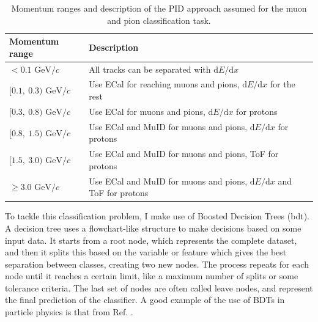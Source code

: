 \begin{table}[t]
	\caption{Momentum ranges and description of the PID approach assumed for the muon and pion classification task.}
	\begin{center}
		\begin{small}
			\begin{tabular}{p{2.7cm}|l}
				Momentum range                                    & Description                                                                          \\[1mm] \hline \rule{0pt}{1.1\normalbaselineskip}
				$< 0.1$ \hfill $\mathrm{GeV}/c$      & All tracks can be separated with $\mathrm{d}E/\mathrm{d}x$                           \\[2mm]
				$[0.1,~0.3)$ \hfill $\mathrm{GeV}/c$ & Use ECal for reaching muons and pions, $\mathrm{d}E/\mathrm{d}x$ for the rest        \\[2mm]
				$[0.3,~0.8)$ \hfill $\mathrm{GeV}/c$ & Use ECal for muons and pions, $\mathrm{d}E/\mathrm{d}x$ for protons                  \\[2mm]
				$[0.8,~1.5)$ \hfill $\mathrm{GeV}/c$ & Use ECal and MuID for muons and pions,  $\mathrm{d}E/\mathrm{d}x$ for protons        \\[2mm]
				$[1.5,~3.0)$ \hfill $\mathrm{GeV}/c$ & Use ECal and MuID for muons and pions, ToF for protons                               \\[2mm]
				$\geq 3.0$ \hfill $\mathrm{GeV}/c$   & Use ECal and MuID for muons and pions, $\mathrm{d}E/\mathrm{d}x$ and ToF for protons
			\end{tabular}
		\end{small}
	\end{center}
	\label{tab:bdt_regions}
\end{table}

To tackle this classification problem, I make use of Boosted Decision Trees (\gls{bdt}). A decision tree uses a flowchart-like structure to make decisions based on some input data. It starts from a root node, which represents the complete dataset, and then it splits this based on the variable or feature which gives the best separation between classes, creating two new nodes. The process repeats for each node until it reaches a certain limit, like a maximum number of splits or some tolerance criteria. The last set of nodes are often called leave nodes, and represent the final prediction of the classifier. A good example of the use of BDTs in particle physics is that from Ref. \cite{Cornell2021}.

